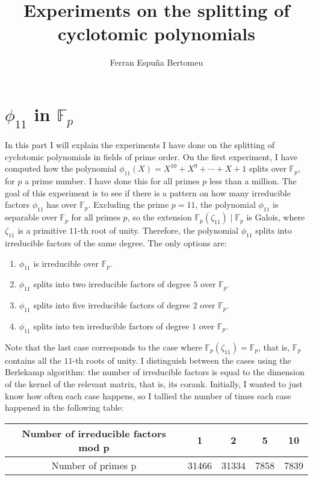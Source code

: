 \documentclass[11pt]{article}
\title{Experiments on the splitting of cyclotomic polynomials}
\author{Ferran Espuña Bertomeu}
\theoremstyle{definition}
\begin{document}
    \maketitle

    \section{$\phi_{11}$ in $\mathbb{F}_p$}

    \noindent In this part I will explain the experiments I have done on the splitting of cyclotomic polynomials in fields of prime order.
    On the first experiment, I have computed how the polynomial $\phi_{11}(X) = X^{10} + X^9 + \cdots + X + 1$ splits over $\mathbb{F}_p$,
    for $p$ a prime number.
    I have done this for all primes $p$ less than a million.
    The goal of this experiment is to see if there is a pattern on how many irreducible factors $\phi_{11}$ has
    over $\mathbb{F}_p$.
    Excluding the prime $p = 11$, the polynomial $\phi_{11}$ is separable over $\mathbb{F}_p$ for all primes $p$, so the
    extension $\mathbb{F}_p(\zeta_{11})\mid\mathbb{F}_p$ is Galois, where $\zeta_{11}$ is a primitive $11$-th root of unity.
    Therefore, the polynomial $\phi_{11}$ splits into
    irreducible factors of the same degree.
    The only options are:
    \begin{enumerate}
        \item $\phi_{11}$ is irreducible over $\mathbb{F}_p$.
        \item $\phi_{11}$ splits into two irreducible factors of degree $5$ over $\mathbb{F}_p$.
        \item $\phi_{11}$ splits into five irreducible factors of degree $2$ over $\mathbb{F}_p$.
        \item $\phi_{11}$ splits into ten irreducible factors of degree $1$ over $\mathbb{F}_p$.
    \end{enumerate}

    \noindent Note that the last case corresponds to the case where $\mathbb{F}_p(\zeta_{11}) = \mathbb{F}_p$, that is,
    $\mathbb{F}_p$ contains all the $11$-th roots of unity.
    I distinguish between the cases using the Berlekamp algorithm: the number of irreducible factors is equal to the
    dimension of the kernel of the relevant matrix, that is, its corank.
    Initially, I wanted to just know how often each case happens, so I tallied the number of times each case happened in the following table:

    \begin{center}
        \begin{tabular}{|c|c|c|c|c|}
            \hline
            Number of irreducible factors mod p & 1 & 2 & 5 & 10 \\
            \hline
            Number of primes p & 31466 & 31334 & 7858 & 7839 \\
            \hline
        \end{tabular}
    \end{center}
\end{document}
